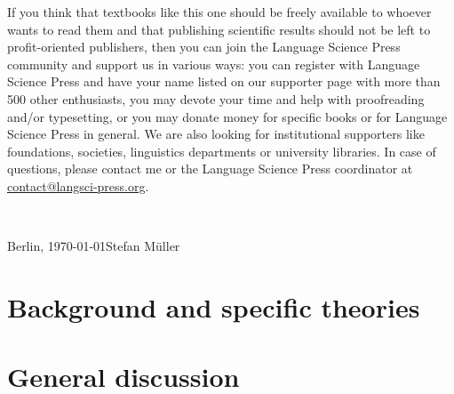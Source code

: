 If you think that textbooks like this one should be freely available to whoever wants to read them
and that publishing scientific results should not be left to profit-oriented publishers, then you
can join the Language Science Press community and support us in various ways: you can register with Language Science Press and have your name
listed on our supporter page with more than 500 other enthusiasts, you may devote your time and help
with proofreading and/or typesetting, or you may donate money for specific books or for Language
Science Press in general. We are also looking for institutional supporters like foundations,
societies, linguistics departments or university libraries. In case of questions, please contact me
or the Language Science Press coordinator at \href{mailto:contact@langsci-press.org}{contact@langsci-press.org}.


~\medskip

\noindent
Berlin, \today\hfill Stefan Müller



\mainmatter

\part{Background and specific theories}













%

\part{General discussion}
\label{part-discussion}






%
%
%







\appendix







